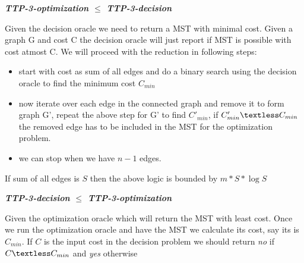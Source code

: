 \documentclass[8pt]{article}
\begin{document}
\textbf{\textit{TTP-3-optimization $\leq$ TTP-3-decision}}

Given the decision oracle we need to return a MST with minimal cost. Given a graph G and cost C the decision oracle will just report if MST
is possible with cost atmost C. We will proceed with the reduction in following steps:
\begin{itemize}
\item start with cost as sum of all edges and do a binary search using the decision oracle to find the minimum cost $C_{min}$
\item now iterate over each edge in the connected graph and remove it to form graph G', repeat the above step for G' to find $C'_{min}$, if
    $C'_{min} \textless C_{min}$ the removed edge has to be included in the MST for the optimization problem.
\item we can stop when we have $n - 1$ edges. 
\end{itemize}
If sum of all edges is $S$ then the above logic is bounded by $m*S*\log{S}$

\textbf{\textit{TTP-3-decision $\leq$ TTP-3-optimization}}

Given the optimization oracle which will return the MST with least cost. Once we run the optimization oracle and have the MST we calculate its cost,
say its is $C_{min}$. If $C$ is the input cost in the decision problem we should return \textit{no } if $C \textless C_{min}$ and \textit{yes }otherwise
\end{document}
